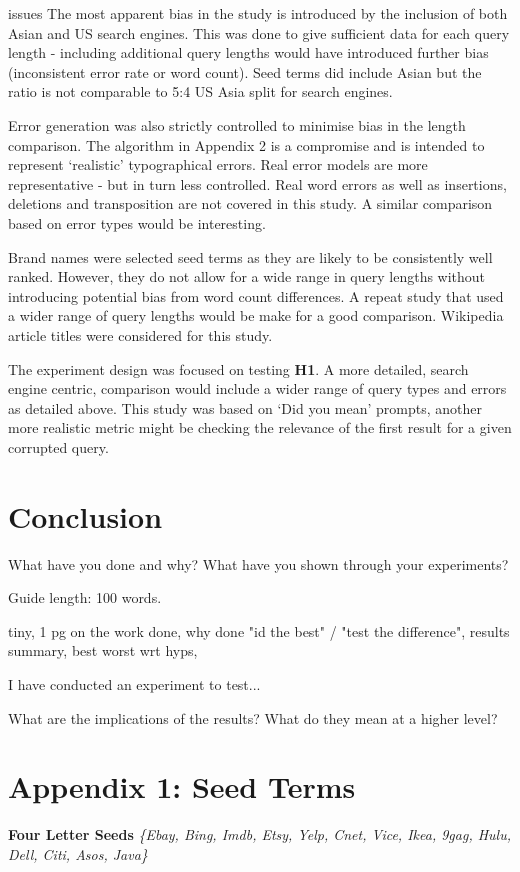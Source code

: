 \documentclass{csfourzero}
\begin{document}
issues
The most apparent bias in the study is introduced by the inclusion of both Asian and US search engines. This was done to give sufficient data for each query length - including additional query lengths would have introduced further bias (inconsistent error rate or word count). Seed terms did include Asian but the ratio is not comparable to 5:4 US Asia split for search engines.

Error generation was also strictly controlled to minimise bias in the length comparison. The algorithm in Appendix 2 is a compromise and is intended to represent `realistic' typographical errors. Real error models are more representative - but in turn less controlled. Real word errors as well as insertions, deletions and transposition are not covered in this study. A similar comparison based on error types would be interesting.

Brand names were selected seed terms as they are likely to be consistently well ranked. However, they do not allow for a wide range in query lengths without introducing potential bias from word count differences. A repeat study that used a wider range of query lengths would be make for a good comparison. Wikipedia article titles were considered for this study.

The experiment design was focused on testing \textbf{H1}. A more detailed, search engine centric, comparison would include a wider range of query types and errors as detailed above. This study was based on `Did you mean' prompts, another more realistic metric might be checking the relevance of the first result for a given corrupted query.


\section{Conclusion}
\label{sec:conc}

What have you done and why? What have you shown through your
experiments?

Guide length: 100 words.

tiny, 1 pg on the work done, why done "id the best" / "test the difference", results summary, best worst wrt hyps,

I have conducted an experiment to test...

What are the implications of the results? What do they mean at a higher level?

\raggedbottom


\pagebreak
\raggedbottom
\section{Appendix 1: Seed Terms}
\textbf{Four Letter Seeds}
\textit{\{Ebay, Bing, Imdb, Etsy, Yelp, Cnet, Vice, Ikea, 9gag, Hulu, Dell, Citi, Asos, Java\}}
\end{document}
